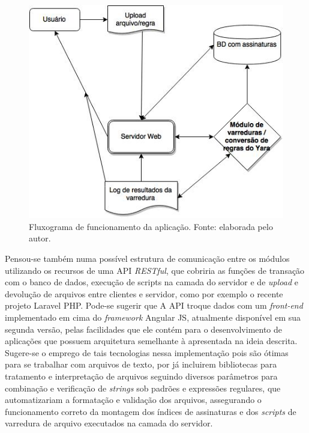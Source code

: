 \begin{figure}[H]
  \includegraphics[scale=0.6]{figs/flux_prototipo}
  \centering
  \caption{Fluxograma de funcionamento da aplicação. Fonte: elaborada pelo autor.}
  \label{f.flux_prototipo}
\end{figure}

Pensou-se também numa possível estrutura de comunicação entre os módulos utilizando
os recursos de uma API \textit{RESTful}, que cobriria as funções de transação com
o banco de dados, execução de scripts na camada do servidor e de \textit{upload}
e devolução de arquivos entre clientes e servidor, como por exemplo o recente projeto
Laravel PHP. Pode-se sugerir que A API troque dados com um \textit{front-end} implementado em cima
do \textit{framework} Angular JS, atualmente disponível em sua segunda versão,
pelas facilidades que ele contém para o desenvolvimento
de aplicações que possuem arquitetura semelhante à apresentada na ideia descrita.
Sugere-se o emprego de tais tecnologias nessa implementação pois são ótimas para se trabalhar com arquivos de texto,
por já incluirem bibliotecas para tratamento e interpretação de arquivos seguindo
diversos parâmetros para combinação e verificação de \textit{strings} sob padrões e
expressões regulares, que automatizariam a formatação e validação dos arquivos,
assegurando o funcionamento correto da montagem dos índices de assinaturas e dos
\textit{scripts} de varredura de arquivo executados na camada do servidor.

